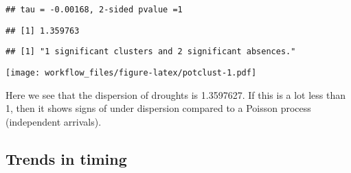 \documentclass[
]{article}
\newenvironment{Shaded}{\begin{snugshade}}{\end{snugshade}}
\newcommand{\AttributeTok}[1]{\textcolor[rgb]{0.77,0.63,0.00}{#1}}
\newcommand{\ConstantTok}[1]{\textcolor[rgb]{0.00,0.00,0.00}{#1}}
\newcommand{\DecValTok}[1]{\textcolor[rgb]{0.00,0.00,0.81}{#1}}
\newcommand{\FunctionTok}[1]{\textcolor[rgb]{0.00,0.00,0.00}{#1}}
\newcommand{\NormalTok}[1]{#1}
\newcommand{\OtherTok}[1]{\textcolor[rgb]{0.56,0.35,0.01}{#1}}
\newcommand{\SpecialCharTok}[1]{\textcolor[rgb]{0.00,0.00,0.00}{#1}}
\newcommand{\StringTok}[1]{\textcolor[rgb]{0.31,0.60,0.02}{#1}}
\begin{document}
\begin{verbatim}
## tau = -0.00168, 2-sided pvalue =1
\end{verbatim}

\begin{Shaded}
\end{Shaded}

\begin{verbatim}
## [1] 1.359763
\end{verbatim}

\begin{Shaded}
\end{Shaded}

\begin{verbatim}
## [1] "1 significant clusters and 2 significant absences."
\end{verbatim}

\texttt{[image: workflow\_files/figure-latex/potclust-1.pdf]}

Here we see that the dispersion of droughts is 1.3597627. If this is a
lot less than 1, then it shows signs of under dispersion compared to a
Poisson process (independent arrivals).

\hypertarget{trends-in-timing}{%
\subsection{Trends in timing}\label{trends-in-timing}}
\end{document}

